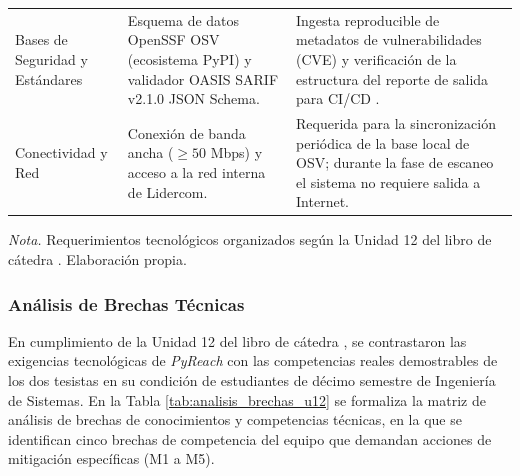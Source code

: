 \begin{table}[H]
\begin{tabularx}{\textwidth}{>{\bfseries\raggedright\arraybackslash}p{3.0cm} >{\raggedright\arraybackslash}p{4.6cm} X}
\addlinespace
Bases de Seguridad y Estándares & 
Esquema de datos OpenSSF OSV (ecosistema PyPI) y validador OASIS SARIF v2.1.0 JSON Schema. & 
Ingesta reproducible de metadatos de vulnerabilidades (CVE) y verificación de la estructura del reporte de salida para CI/CD \parencite{oasis2019sarif, openssf2023osv}. \\ %
\addlinespace
Conectividad y Red & 
Conexión de banda ancha ($\ge 50$ Mbps) y acceso a la red interna de Lidercom. & 
Requerida para la sincronización periódica de la base local de OSV; durante la fase de escaneo el sistema no requiere salida a Internet. \\
\bottomrule
\end{tabularx}
\vspace{2pt}
\begin{flushleft}
\scriptsize \textit{Nota.} Requerimientos tecnológicos organizados según la Unidad 12 del libro de cátedra \parencite{torres2026proyecto}. Elaboración propia. %
\end{flushleft}
\end{table}

\subsubsection{Análisis de Brechas Técnicas}
En cumplimiento de la Unidad 12 del libro de cátedra \parencite{torres2026proyecto}, se contrastaron las exigencias tecnológicas de \textit{PyReach} con las competencias reales demostrables de los dos tesistas en su condición de estudiantes de décimo semestre de Ingeniería de Sistemas. %
En la Tabla \ref{tab:analisis_brechas_u12} se formaliza la matriz de análisis de brechas de conocimientos y competencias técnicas, en la que se identifican cinco brechas de competencia del equipo que demandan acciones de mitigación específicas (M1 a M5). %

